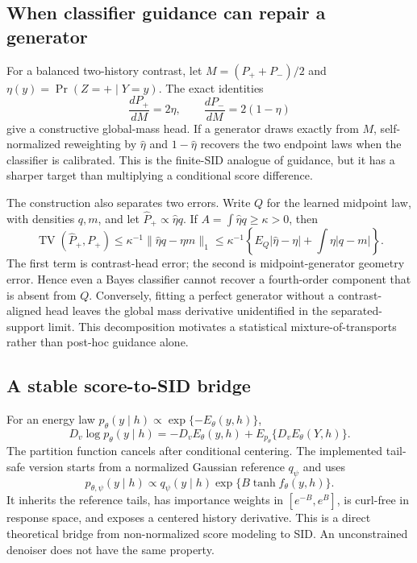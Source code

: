 \documentclass[10pt]{article}
\begin{document}
\subsection{When classifier guidance can repair a generator}

For a balanced two-history contrast, let
$M=(P_++P_-)/2$ and $\eta(y)=\Pr(Z=+\mid Y=y)$.  The exact identities
\[
  \frac{dP_+}{dM}=2\eta,
  \qquad
  \frac{dP_-}{dM}=2(1-\eta)
\]
give a constructive global-mass head.  If a generator draws exactly from $M$,
self-normalized reweighting by $\widehat\eta$ and $1-\widehat\eta$ recovers the
two endpoint laws when the classifier is calibrated.  This is the finite-SID
analogue of guidance, but it has a sharper target than multiplying a conditional
score difference.

The construction also separates two errors.  Write $Q$ for the learned midpoint
law, with densities $q,m$, and let
$\widehat P_+\propto\widehat\eta q$.  If
$A=\int\widehat\eta q\geq\kappa>0$, then
\[
 \operatorname{TV}(\widehat P_+,P_+)
 \leq \kappa^{-1}\|\widehat\eta q-\eta m\|_1
 \leq \kappa^{-1}\left\{
 E_Q|\widehat\eta-\eta|+\int\eta|q-m|
 \right\}.
\]
The first term is contrast-head error; the second is midpoint-generator geometry
error.  Hence even a Bayes classifier cannot recover a fourth-order component
that is absent from $Q$.  Conversely, fitting a perfect generator without a
contrast-aligned head leaves the global mass derivative unidentified in the
separated-support limit.  This decomposition motivates a statistical
mixture-of-transports rather than post-hoc guidance alone.

\subsection{A stable score-to-SID bridge}

For an energy law $p_\theta(y\mid h)\propto\exp\{-E_\theta(y,h)\}$,
\[
 D_v\log p_\theta(y\mid h)
 =-D_vE_\theta(y,h)+E_{p_\theta}\{D_vE_\theta(Y,h)\}.
\]
The partition function cancels after conditional centering.  The implemented
tail-safe version starts from a normalized Gaussian reference $q_\psi$ and uses
\[
 p_{\theta,\psi}(y\mid h)
 \propto q_\psi(y\mid h)
 \exp\{B\tanh f_\theta(y,h)\}.
\]
It inherits the reference tails, has importance weights in $[e^{-B},e^B]$, is
curl-free in response space, and exposes a centered history derivative.  This is
a direct theoretical bridge from non-normalized score modeling to SID.  An
unconstrained denoiser does not have the same property.
\end{document}
